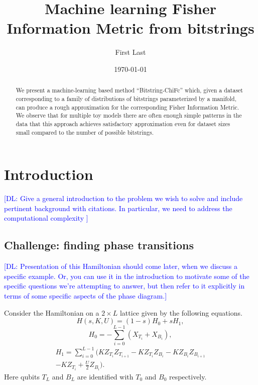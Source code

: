 \documentclass[
  american,aps,pra,reprint,floatfix,nofootinbib,superscriptaddress
]{revtex4-2}
\newcommand{\DL}[1]{\textcolor{blue}{[DL: #1]}}
\begin{document}
\title{Machine learning Fisher Information Metric from bitstrings}
\author{First Last}

\date{\today}

\begin{abstract}
We present a machine-learning based method ``Bitstring-ChiFc'' which,
given a dataset corresponding to a family of distributions of bitstrings
parameterized by a manifold, can produce a rough approximation
for the corresponding Fisher Information Metric.
We observe that for multiple toy models there are often enough simple patterns
in the data that this approach
achieves satisfactory approximation even for dataset sizes small
compared to the number of possible bitstrings.
\end{abstract}

\maketitle

\section{Introduction}
\DL{Give a general introduction to the problem we wish to solve and include pertinent background with citations. In particular, we need to address the computational complexity }

\subsection{Challenge: finding phase transitions}

\DL{Presentation of this Hamiltonian should come later, when we discuss a specific example. Or, you can use it in the introduction to motivate some of the specific questions we're attempting to answer, but then refer to it explicitly in terms of some specific aspects of the phase diagram.}

Consider the Hamiltonian
on a $2 \times L$ lattice given by the following equations.
\begin{equation}
  \label{eq:Hladder.1}
  H(s,K,U) = (1-s) H_0 + s H_1,
\end{equation}
\begin{equation}
  \label{eq:Hladder.2}
  H_0 = -\sum_{i=0}^{L-1} (X_{T_i} + X_{B_i}),
\end{equation}
\begin{multline}
  \label{eq:Hladder.3}
  H_1 = \sum_{i=0}^{L-1} \biggl(K Z_{T_i} Z_{T_{i+1}} - K Z_{T_i} Z_{B_i}
    - K Z_{B_i} Z_{B_{i+1}} \\
  - K Z_{T_i} + \frac{U}{2} Z_{B_i}\biggr).
\end{multline}
Here qubits $T_L$ and $B_L$ are identified with $T_0$ and $B_0$ respectively.
\end{document}
